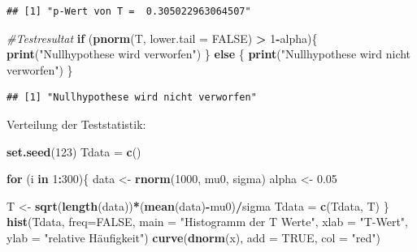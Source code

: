 \documentclass[]{article}
\newenvironment{Shaded}{\begin{snugshade}}{\end{snugshade}}
\newcommand{\CommentTok}[1]{\textcolor[rgb]{0.56,0.35,0.01}{\textit{#1}}}
\newcommand{\ControlFlowTok}[1]{\textcolor[rgb]{0.13,0.29,0.53}{\textbf{#1}}}
\newcommand{\DataTypeTok}[1]{\textcolor[rgb]{0.13,0.29,0.53}{#1}}
\newcommand{\DecValTok}[1]{\textcolor[rgb]{0.00,0.00,0.81}{#1}}
\newcommand{\FloatTok}[1]{\textcolor[rgb]{0.00,0.00,0.81}{#1}}
\newcommand{\KeywordTok}[1]{\textcolor[rgb]{0.13,0.29,0.53}{\textbf{#1}}}
\newcommand{\NormalTok}[1]{#1}
\newcommand{\OperatorTok}[1]{\textcolor[rgb]{0.81,0.36,0.00}{\textbf{#1}}}
\newcommand{\OtherTok}[1]{\textcolor[rgb]{0.56,0.35,0.01}{#1}}
\newcommand{\StringTok}[1]{\textcolor[rgb]{0.31,0.60,0.02}{#1}}
\begin{document}
\begin{verbatim}
## [1] "p-Wert von T =  0.305022963064507"
\end{verbatim}

\begin{Shaded}
\begin{Highlighting}[]
\CommentTok{#Testresultat}
\ControlFlowTok{if}\NormalTok{ (}\KeywordTok{pnorm}\NormalTok{(T, }\DataTypeTok{lower.tail =} \OtherTok{FALSE}\NormalTok{) }\OperatorTok{>}\StringTok{ }\DecValTok{1}\OperatorTok{-}\NormalTok{alpha)\{}
  \KeywordTok{print}\NormalTok{(}\StringTok{"Nullhypothese wird verworfen"}\NormalTok{)}
\NormalTok{\} }\ControlFlowTok{else}\NormalTok{ \{}
  \KeywordTok{print}\NormalTok{(}\StringTok{"Nullhypothese wird nicht verworfen"}\NormalTok{)}
\NormalTok{\}}
\end{Highlighting}
\end{Shaded}

\begin{verbatim}
## [1] "Nullhypothese wird nicht verworfen"
\end{verbatim}

Verteilung der Teststatistik:

\begin{Shaded}
\begin{Highlighting}[]
\KeywordTok{set.seed}\NormalTok{(}\DecValTok{123}\NormalTok{)}
\NormalTok{Tdata =}\StringTok{ }\KeywordTok{c}\NormalTok{()}

\ControlFlowTok{for}\NormalTok{ (i }\ControlFlowTok{in} \DecValTok{1}\OperatorTok{:}\DecValTok{300}\NormalTok{)\{}
\NormalTok{  data <-}\StringTok{ }\KeywordTok{rnorm}\NormalTok{(}\DecValTok{1000}\NormalTok{, mu0, sigma)}
\NormalTok{  alpha <-}\StringTok{ }\FloatTok{0.05}

\NormalTok{  T <-}\StringTok{ }\KeywordTok{sqrt}\NormalTok{(}\KeywordTok{length}\NormalTok{(data))}\OperatorTok{*}\NormalTok{(}\KeywordTok{mean}\NormalTok{(data)}\OperatorTok{-}\NormalTok{mu0)}\OperatorTok{/}\NormalTok{sigma}
\NormalTok{  Tdata =}\StringTok{ }\KeywordTok{c}\NormalTok{(Tdata, T)}
\NormalTok{\}}
\KeywordTok{hist}\NormalTok{(Tdata, }\DataTypeTok{freq=}\OtherTok{FALSE}\NormalTok{, }\DataTypeTok{main =} \StringTok{"Histogramm der T Werte"}\NormalTok{, }\DataTypeTok{xlab =} \StringTok{"T-Wert"}\NormalTok{, }\DataTypeTok{ylab =} \StringTok{"relative Häufigkeit"}\NormalTok{)}
\KeywordTok{curve}\NormalTok{(}\KeywordTok{dnorm}\NormalTok{(x), }\DataTypeTok{add =} \OtherTok{TRUE}\NormalTok{, }\DataTypeTok{col =} \StringTok{"red"}\NormalTok{)}
\end{Highlighting}
\end{Shaded}
\end{document}
